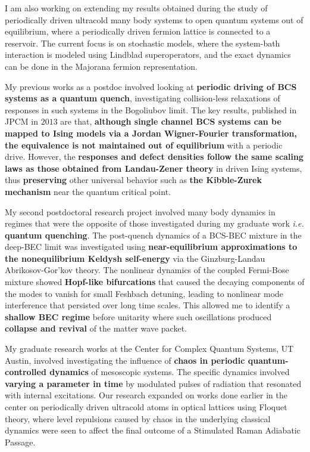 \documentclass[a4paper,11pt]{article}
\begin{document}
I am also working on extending my results obtained during the study of periodically driven ultracold many body systems to open quantum systems out of equilibrium, where a periodically driven fermion lattice is connected to a reservoir. The current focus is on stochastic models, where the system-bath interaction is modeled using Lindblad superoperators, and the exact dynamics can be done in the Majorana fermion representation.

My previous works as a postdoc involved looking at \textbf{periodic driving of BCS systems as a quantum quench}, investigating collision-less relaxations of responses in such systems in the Bogoliubov limit. The key results, published in JPCM in $2013$ are that, \textbf{although single channel BCS systems can be mapped to Ising models via a Jordan Wigner-Fourier transformation, the equivalence is not maintained out of equilibrium} with a periodic drive. However, the \textbf{responses  and defect densities follow the same scaling laws as those obtained from Landau-Zener theory} in driven Ising systems, thus \textbf{preserving} other universal behavior such as \textbf{the Kibble-Zurek mechanism} near the quantum critical point.

My second postdoctoral research project involved many body dynamics in regimes that were the opposite of those investigated during my graduate work \textit{i.e.} \textbf{quantum quenching}. The post-quench dynamics of a BCS-BEC mixture in the deep-BEC limit was investigated using \textbf{near-equilibrium approximations to the nonequilibrium Keldysh self-energy} via the Ginzburg-Landau Abrikosov-Gor'kov theory. The nonlinear dynamics of the coupled Fermi-Bose mixture showed \textbf{Hopf-like bifurcations} that caused the decaying components of the modes to vanish for small Feshbach detuning, leading to nonlinear mode interference  that persisted over long time scales. This allowed me to identify a \textbf{shallow BEC regime} before unitarity where such oscillations produced \textbf{collapse and revival} of the matter wave packet. 

My graduate research works at the Center for Complex Quantum Systems, UT Austin, involved investigating the influence of \textbf{chaos in periodic quantum-controlled dynamics} of mesoscopic systems. The specific dynamics involved \textbf{varying a parameter in time} by modulated pulses of radiation that resonated with internal excitations. Our research expanded on works done earlier in the center on periodically driven ultracold atoms in optical lattices using Floquet theory, where level repulsions caused by chaos in the underlying classical dynamics were seen to affect the final outcome of a Stimulated Raman Adiabatic Passage.
\end{document}
